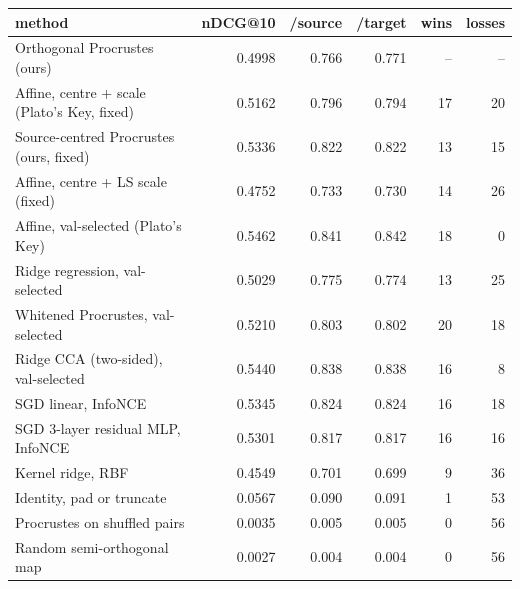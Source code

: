 \begin{tabular}{lrrrrr}
\toprule
method & nDCG@10 & /source & /target & wins & losses \\
\midrule
Orthogonal Procrustes (ours) & 0.4998 & 0.766 & 0.771 & -- & -- \\
Affine, centre + scale (Plato's Key, fixed) & 0.5162 & 0.796 & 0.794 & 17 & 20 \\
Source-centred Procrustes (ours, fixed) & 0.5336 & 0.822 & 0.822 & 13 & 15 \\
Affine, centre + LS scale (fixed) & 0.4752 & 0.733 & 0.730 & 14 & 26 \\
Affine, val-selected (Plato's Key) & 0.5462 & 0.841 & 0.842 & 18 & 0 \\
Ridge regression, val-selected & 0.5029 & 0.775 & 0.774 & 13 & 25 \\
Whitened Procrustes, val-selected & 0.5210 & 0.803 & 0.802 & 20 & 18 \\
Ridge CCA (two-sided), val-selected & 0.5440 & 0.838 & 0.838 & 16 & 8 \\
SGD linear, InfoNCE & 0.5345 & 0.824 & 0.824 & 16 & 18 \\
SGD 3-layer residual MLP, InfoNCE & 0.5301 & 0.817 & 0.817 & 16 & 16 \\
Kernel ridge, RBF & 0.4549 & 0.701 & 0.699 & 9 & 36 \\
Identity, pad or truncate & 0.0567 & 0.090 & 0.091 & 1 & 53 \\
Procrustes on shuffled pairs & 0.0035 & 0.005 & 0.005 & 0 & 56 \\
Random semi-orthogonal map & 0.0027 & 0.004 & 0.004 & 0 & 56 \\
\bottomrule
\end{tabular}